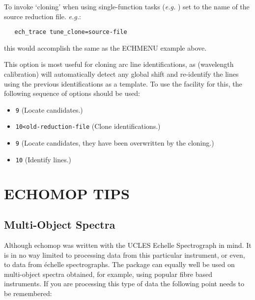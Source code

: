 To invoke `cloning' when using single-function tasks ({\it{e.g.}}
) set
 to the name of the source
reduction file. {\it{e.g.}}:

\verb+   ech+{\tt\_trace tune\_clone=source-file}

this would accomplish the same as the ECHMENU example above.

This option is most useful for cloning arc line identifications, as
 (wavelength calibration) will automatically
detect any global shift and re-identify the lines using the previous
identifications as a template.
To use the facility for this, the following sequence of options
should be used:

\begin{itemize}

\item {\verb+9+ (Locate candidates.)}
\item {\verb+10<old-reduction-file+ (Clone identifications.)}
\item {\verb+9+ (Locate candidates, they have been overwritten by the
      cloning.)}
\item {\verb+10+ (Identify lines.)}

\end{itemize}


\section{ECHOMOP TIPS}

\subsection{Multi-Object Spectra}

Although {\sc echomop} was written with the UCLES Echelle Spectrograph in mind.
It is in no way limited to processing data from this particular instrument,
or even, to data from \'{e}chelle spectrographs.  The package can equally well
be used on multi-object spectra obtained, for example, using popular
fibre based instruments.  If you are processing this type of data the
following point needs to be remembered:

